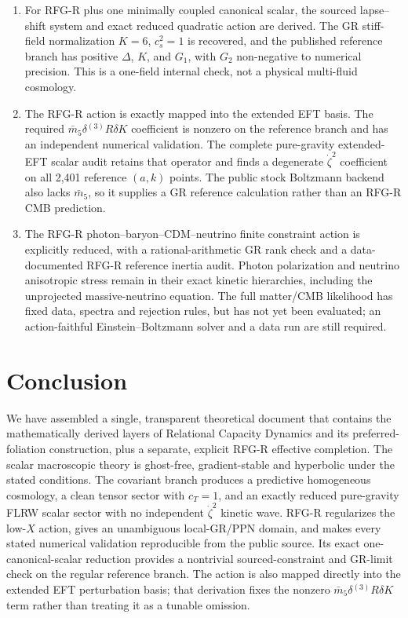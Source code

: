 \documentclass[11pt,a4paper]{article}
\begin{document}
\begin{enumerate}
\item For RFG-R plus one minimally coupled canonical scalar, the sourced lapse--shift system and exact reduced quadratic action are derived. The GR stiff-field normalization \(K=6\), \(c_s^2=1\) is recovered, and the published reference branch has positive \(\Delta\), \(K\), and \(G_1\), with \(G_2\) non-negative to numerical precision. This is a one-field internal check, not a physical multi-fluid cosmology.
\item The RFG-R action is exactly mapped into the extended EFT basis. The required \(\bar m_5\delta{}^{(3)}R\delta K\) coefficient is nonzero on the reference branch and has an independent numerical validation. The complete pure-gravity extended-EFT scalar audit retains that operator and finds a degenerate \(\dot\zeta^2\) coefficient on all 2,401 reference \((a,k)\) points. The public stock Boltzmann backend also lacks \(\bar m_5\), so it supplies a GR reference calculation rather than an RFG-R CMB prediction.
\item The RFG-R photon--baryon--CDM--neutrino finite constraint action is explicitly reduced, with a rational-arithmetic GR rank check and a data-documented RFG-R reference inertia audit. Photon polarization and neutrino anisotropic stress remain in their exact kinetic hierarchies, including the unprojected massive-neutrino equation. The full matter/CMB likelihood has fixed data, spectra and rejection rules, but has not yet been evaluated; an action-faithful Einstein--Boltzmann solver and a data run are still required.
\end{enumerate}


\newpage
\section{Conclusion}

We have assembled a single, transparent theoretical document that contains the mathematically derived layers of Relational Capacity Dynamics and its preferred-foliation construction, plus a separate, explicit RFG-R effective completion. The scalar macroscopic theory is ghost-free, gradient-stable and hyperbolic under the stated conditions. The covariant branch produces a predictive homogeneous cosmology, a clean tensor sector with \(c_T=1\), and an exactly reduced pure-gravity FLRW scalar sector with no independent \(\dot\zeta^2\) kinetic wave. RFG-R regularizes the low-\(X\) action, gives an unambiguous local-GR/PPN domain, and makes every stated numerical validation reproducible from the public source. Its exact one-canonical-scalar reduction provides a nontrivial sourced-constraint and GR-limit check on the regular reference branch. The action is also mapped directly into the extended EFT perturbation basis; that derivation fixes the nonzero \(\bar m_5\delta{}^{(3)}R\delta K\) term rather than treating it as a tunable omission.
\end{document}
